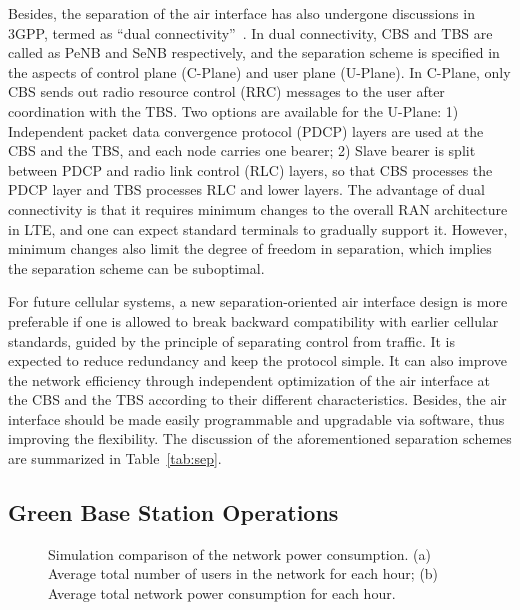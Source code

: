 \documentclass[12pt, draftclsnofoot,onecolumn]{IEEEtran}
\begin{document}
Besides, the separation of the air interface has also undergone discussions in 3GPP,
termed as ``dual connectivity''~\cite{3gppdcr12}.
In dual connectivity, CBS and TBS are called as PeNB and SeNB respectively, and
the separation scheme is specified in the aspects of control plane (C-Plane)
and user plane (U-Plane).
In C-Plane, only CBS sends out radio resource control (RRC) messages to the user after coordination with the TBS.
Two options are available for the U-Plane:
1) Independent packet data convergence protocol (PDCP) layers are used at the CBS and the TBS, and each node carries one
bearer;
2) Slave bearer is split between PDCP and radio link control (RLC) layers, so that CBS processes the PDCP
layer and TBS processes RLC and lower layers.
The advantage of dual connectivity is that it requires minimum
changes to the overall RAN architecture in LTE, and one can expect
standard terminals to gradually support it.
However, minimum changes also limit the degree of freedom in separation, which
implies the separation scheme can be suboptimal.

For future cellular systems, a new separation-oriented air interface design is more preferable
if one is allowed to break backward compatibility with earlier cellular standards, guided by the principle of separating control from traffic.
It is expected to reduce redundancy and keep the protocol simple. It can also improve the network efficiency through independent optimization of
the air interface at the CBS and the TBS according to their different characteristics.
Besides, the air interface should be made easily programmable and upgradable
via software, thus improving the flexibility. The discussion of the aforementioned separation schemes are summarized in Table~\ref{tab:sep}.

\subsection{Green Base Station Operations}

\begin{figure}[!t]
\centering
{}
\hfil
{}
\caption{Simulation comparison of the network power consumption. (a) Average total number of users in the network for each hour; (b) Average total network power consumption for each hour.}
\label{fig_sim}
\end{figure}
\end{document}
